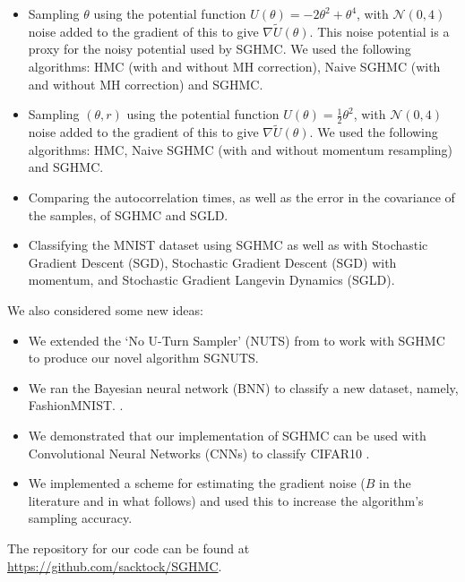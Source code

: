 \begin{itemize}
    \item Sampling $\theta$ using the potential function $U(\theta) = -2\theta^2 + \theta^4$, with $\mathcal{N}(0,4)$ noise added to the gradient of this to give $\nabla \widetilde U (\theta)$. This noise potential is a proxy for the noisy potential used by SGHMC. We used the following algorithms: HMC (with and without MH correction), Naive SGHMC (with and without MH correction) and SGHMC.

    \item  Sampling $(\theta,r)$ using the potential function $U(\theta) = \frac{1}{2}\theta^2$, with $\mathcal{N}(0,4)$ noise added to the gradient of this to give $\nabla \widetilde U (\theta)$. We used the following algorithms: HMC, Naive SGHMC (with and without momentum resampling) and SGHMC.
  \item Comparing the autocorrelation times, as well as the error in the covariance of the samples, of SGHMC and SGLD.
    \item Classifying the MNIST dataset \cite{mnist} using SGHMC as well as with Stochastic Gradient Descent (SGD), Stochastic Gradient Descent (SGD) with momentum, and Stochastic Gradient Langevin Dynamics (SGLD).
\end{itemize}

We also considered some new ideas:

\begin{itemize}
    \item We extended the `No U-Turn Sampler' (NUTS) from \cite{nuts} to work with SGHMC to produce our novel algorithm SGNUTS.
    \item We ran the Bayesian neural network (BNN) to classify a new dataset, namely, FashionMNIST. \cite{fashion-mnist}.
    \item We demonstrated that our implementation of SGHMC can be used with Convolutional Neural Networks (CNNs) to classify CIFAR10 \cite{cifar10}.
    \item We implemented a scheme for estimating the gradient noise ($B$ in the literature and in what follows) and used this to increase the algorithm’s sampling accuracy.
\end{itemize}

The repository for our code can be found at \url{https://github.com/sacktock/SGHMC}.
